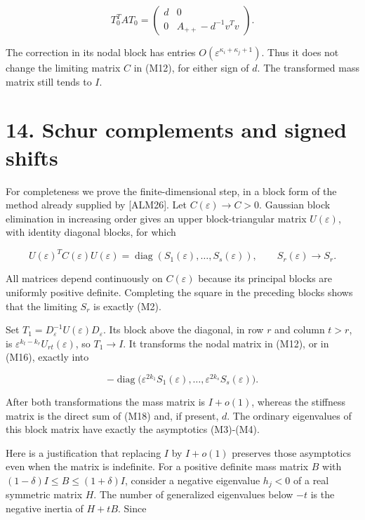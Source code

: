 \documentclass[11pt]{article}
\begin{document}
\[
 T_0^TAT_0=
 \begin{pmatrix}d&0\\0&A_{++}-d^{-1}v^Tv\end{pmatrix}.
 \tag{M16}
\]

The correction in its nodal block has entries
\(O(\varepsilon^{\kappa_i+\kappa_j+1})\). Thus it does not change the
limiting matrix \(C\) in (M12), for either sign of \(d\). The
transformed mass matrix still tends to \(I\).

\section{14. Schur complements and signed
shifts}\label{schur-complements-and-signed-shifts}

For completeness we prove the finite-dimensional step, in a block form
of the method already supplied by {[}ALM26{]}. Let
\(C(\varepsilon)\to C>0\). Gaussian block elimination in increasing
order gives an upper block-triangular matrix \(U(\varepsilon)\), with
identity diagonal blocks, for which

\[
 U(\varepsilon)^TC(\varepsilon)U(\varepsilon)
  =\operatorname{diag}(S_1(\varepsilon),\ldots,S_s(\varepsilon)),
 \qquad S_r(\varepsilon)\longrightarrow S_r.
 \tag{M17}
\]

All matrices depend continuously on \(C(\varepsilon)\) because its
principal blocks are uniformly positive definite. Completing the square
in the preceding blocks shows that the limiting \(S_r\) is exactly (M2).

Set \(T_1=D_\varepsilon^{-1}U(\varepsilon)D_\varepsilon\). Its block
above the diagonal, in row \(r\) and column \(t>r\), is
\(\varepsilon^{k_t-k_r}U_{rt}(\varepsilon)\), so \(T_1\to I\). It
transforms the nodal matrix in (M12), or in (M16), exactly into

\[
 -\operatorname{diag}\big(
   \varepsilon^{2k_1}S_1(\varepsilon),\ldots,
   \varepsilon^{2k_s}S_s(\varepsilon)\big).
 \tag{M18}
\]

After both transformations the mass matrix is \(I+o(1)\), whereas the
stiffness matrix is the direct sum of (M18) and, if present, \(d\). The
ordinary eigenvalues of this block matrix have exactly the asymptotics
(M3)-(M4).

Here is a justification that replacing \(I\) by \(I+o(1)\) preserves
those asymptotics even when the matrix is indefinite. For a positive
definite mass matrix \(B\) with \((1-\delta)I\le B\le(1+\delta)I\),
consider a negative eigenvalue \(h_j<0\) of a real symmetric matrix
\(H\). The number of generalized eigenvalues below \(-t\) is the
negative inertia of \(H+tB\). Since
\end{document}
